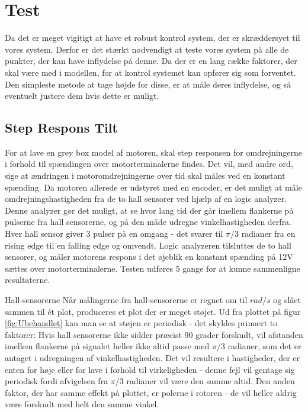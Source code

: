 \section{Test}

Da det er meget vigitigt at have et robust kontrol system, der er skræddersyet til vores system. Derfor er det stærkt nødvendigt at teste vores system på alle de punkter, der kan have inflydelse på denne. Da der er en lang række faktorer, der skal være med i modellen, for at kontrol systemet kan opfører sig som forventet. Den simpleste metode at tage højde for disse, er at måle deres inflydelse, og så eventuelt justere dem hvis dette er muligt.

\subsection{Step Respons Tilt}

For at lave en grey box model af motoren, skal step responsen for omdrejningerne i forhold til spændingen over motorterminalerne findes. Det vil, med andre ord, sige at ændringen i motoromdrejningerne over tid skal måles ved en konstant spænding. Da motoren allerede er udstyret med en encoder, er det muligt at måle omdrejningshastigheden fra de to hall sensorer ved hjælp af en logic analyzer. Denne analyzer gør det muligt, at se hvor lang tid der går imellem flankerne på pulserne fra hall sensorerne, og på den måde udregne vinkelhastigheden derfra. 
Hver hall sensor giver 3 pulser på en omgang - det svarer til $\pi/3$ radianer fra en rising edge til en falling edge og omvendt. Logic analyzeren tilsluttes de to hall sensorer, og måler motorens respons i det øjeblik en konstant spænding på 12V sættes over motorterminalerne. Testen udføres 5 gange for at kunne sammenligne resultaterne. 

Hall-sensorerne Når målingerne fra hall-sensorerne er regnet om til $rad/s$ og slået sammen til ét plot, produceres et plot der er meget støjet. Ud fra plottet på figur \ref{fig:Ubehandlet} kan man se at støjen er periodisk - det skyldes primært to faktorer: Hvis hall sensorerne ikke sidder præcist 90 grader forskudt, vil afstanden imellem flankerne på signalet heller ikke altid passe med $\pi/3$ radianer, som det er antaget i udregningen af vinkelhastigheden. Det vil resultere i hastigheder, der er enten for høje eller for lave i forhold til virkeligheden - denne fejl vil gentage sig periodisk fordi afvigelsen fra $\pi/3$ radianer vil være den samme altid. Den anden faktor, der har samme effekt på plottet, er polerne i rotoren - de vil heller aldrig være forskudt med helt den samme vinkel.

